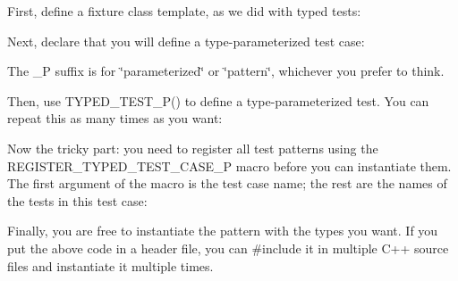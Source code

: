 First, define a fixture class template, as we did with typed tests\+:


\begin{DoxyCode}{0}
\DoxyCodeLine{\};}
\end{DoxyCode}


Next, declare that you will define a type-\/parameterized test case\+:


\begin{DoxyCode}{0}
\end{DoxyCode}


The {\ttfamily \+\_\+P} suffix is for \char`\"{}parameterized\char`\"{} or \char`\"{}pattern\char`\"{}, whichever you prefer to think.

Then, use {\ttfamily T\+Y\+P\+E\+D\+\_\+\+T\+E\+S\+T\+\_\+\+P()} to define a type-\/parameterized test. You can repeat this as many times as you want\+:


\begin{DoxyCode}{0}
\DoxyCodeLine{\}}
\DoxyCodeLine{}
\end{DoxyCode}


Now the tricky part\+: you need to register all test patterns using the {\ttfamily R\+E\+G\+I\+S\+T\+E\+R\+\_\+\+T\+Y\+P\+E\+D\+\_\+\+T\+E\+S\+T\+\_\+\+C\+A\+S\+E\+\_\+P} macro before you can instantiate them. The first argument of the macro is the test case name; the rest are the names of the tests in this test case\+:


\begin{DoxyCode}{0}
\end{DoxyCode}


Finally, you are free to instantiate the pattern with the types you want. If you put the above code in a header file, you can {\ttfamily \#include} it in multiple C++ source files and instantiate it multiple times.


\begin{DoxyCode}{0}
\end{DoxyCode}



